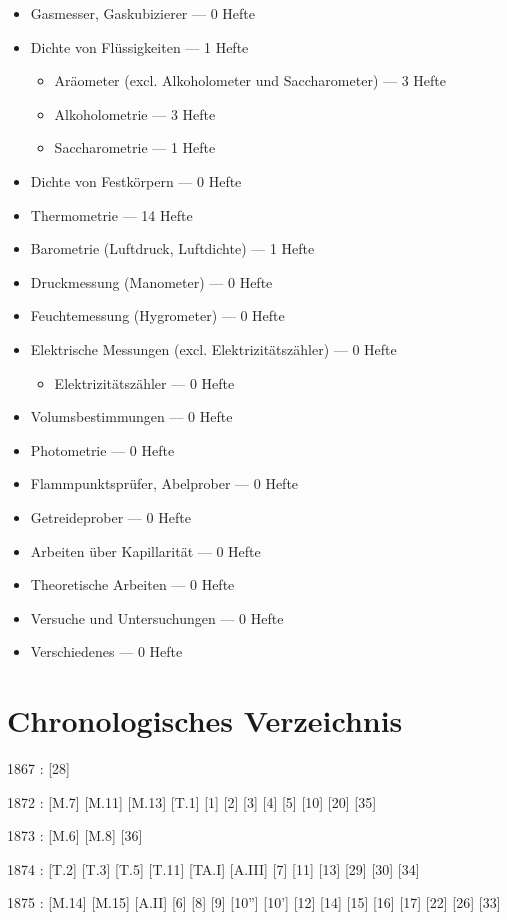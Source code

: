 \begin{itemize}
\item Gasmesser, Gaskubizierer --- 0 Hefte
\item Dichte von Flüssigkeiten --- 1 Hefte
\begin{itemize}
\item Aräometer (excl. Alkoholometer und Saccharometer) --- 3 Hefte
\item Alkoholometrie --- 3 Hefte
\item Saccharometrie --- 1 Hefte
\end{itemize}
\item Dichte von Festkörpern --- 0 Hefte
\item Thermometrie --- 14 Hefte
\item Barometrie (Luftdruck, Luftdichte) --- 1 Hefte
\item Druckmessung (Manometer) --- 0 Hefte
\item Feuchtemessung (Hygrometer) --- 0 Hefte
\item Elektrische Messungen (excl. Elektrizitätszähler) --- 0 Hefte
\begin{itemize}
\item Elektrizitätszähler --- 0 Hefte
\end{itemize}
\item Volumsbestimmungen --- 0 Hefte
\item Photometrie --- 0 Hefte
\item Flammpunktsprüfer, Abelprober --- 0 Hefte
\item Getreideprober --- 0 Hefte
\item Arbeiten über Kapillarität --- 0 Hefte
\item Theoretische Arbeiten --- 0 Hefte
\item Versuche und Untersuchungen --- 0 Hefte
\item Verschiedenes --- 0 Hefte
\end{itemize}

\chapter{Chronologisches Verzeichnis}
1867 : [28]

1872 : [M.7] [M.11] [M.13] [T.1] [1] [2] [3] [4] [5] [10] [20] [35]

1873 : [M.6] [M.8] [36]

1874 : [T.2] [T.3] [T.5] [T.11] [TA.I] [A.III] [7] [11] [13] [29] [30] [34]

1875 : [M.14] [M.15] [A.II] [6] [8] [9] [10''] [10'] [12] [14] [15] [16] [17] [22] [26] [33]

